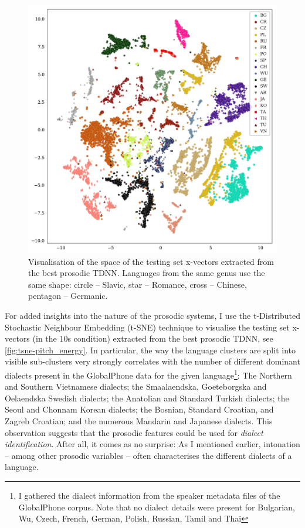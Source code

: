 \documentclass[bsc,frontabs,twoside,singlespacing,parskip,deptreport]{infthesis}
\begin{document}
{{    \begin{figure}[h!]
      \centering
      \includegraphics[width=\textwidth]{../img/tsne-pitch_energy.png}
      \caption{Visualisation of the space of the testing set x-vectors extracted from the best prosodic TDNN. Languages from the same genus use the same shape: circle -- Slavic, star -- Romance, cross -- Chinese, pentagon -- Germanic.}
      \label{fig:tsne-pitch_energy}
    \end{figure}
    For added insights into the nature of the prosodic systems, I use the t-Distributed Stochastic Neighbour Embedding (t-SNE) technique \citep{Maaten_Hinton_2008} to visualise the testing set x-vectors (in the 10s condition) extracted from the best prosodic TDNN, see \autoref{fig:tsne-pitch_energy}. In particular, the way the language clusters are split into visible sub-clusters very strongly correlates with the number of different dominant dialects present in the GlobalPhone data for the given language\footnote{I gathered the dialect information from the speaker metadata files of the GlobalPhone corpus. Note that no dialect details were present for Bulgarian, Wu, Czech, French, German, Polish, Russian, Tamil and Thai}: The Northern and Southern Vietnamese dialects; the Smaalaendska, Goeteborgska and Oelaendska Swedish dialects; the Anatolian and Standard Turkish dialects; the Seoul and Chonnam Korean dialects; the Bosnian, Standard Croatian, and Zagreb Croatian; and the numerous Mandarin and Japanese dialects. This observation suggests that the prosodic features could be used for \textit{dialect identification}. After all, it comes as no surprise: As I mentioned earlier, intonation -- among other prosodic variables -- often characterises the different dialects of a language.

}}
\end{document}
